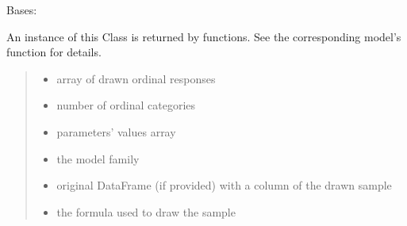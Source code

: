 \documentclass[letterpaper,10pt,english]{sphinxmanual}
\begin{document}
\begin{fulllineitems}
\label{\detokenize{cubmods:cubmods.smry.CUBsample}}
\pysigstartsignatures
{}
\pysigstopsignatures
\sphinxAtStartPar
Bases: 

\sphinxAtStartPar
An instance of this Class is returned by  functions. 
See the corresponding model’s function for details.
\begin{quote}\begin{description}
\begin{itemize}
\item {} 
\sphinxAtStartPar
{} \textendash{} array of drawn ordinal responses

\item {} 
\sphinxAtStartPar
{} \textendash{} number of ordinal categories

\item {} 
\sphinxAtStartPar
{} \textendash{} parameters’ values array

\item {} 
\sphinxAtStartPar
{} \textendash{} the model family

\item {} 
\sphinxAtStartPar
{} \textendash{} original DataFrame (if provided) with a column of the drawn sample

\item {} 
\sphinxAtStartPar
{} \textendash{} the formula used to draw the sample


\end{itemize}
\end{description}
\end{quote}
\end{fulllineitems}
\end{document}
